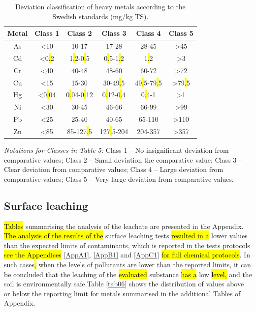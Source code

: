 \documentclass[algorithms,article,submit,pdftex,moreauthors]{Definitions/mdpi}
\begin{document}
\begin{table}[H] 
\begin{threeparttable}
\centering
\caption{Deviation classification of heavy metals according to the Swedish standards (mg/kg TS).\label{tab05}}
\begin{tabularx}{\textwidth}{CCCCCC}
\toprule
\textbf{Metal} & \textbf{Class 1} & \textbf{Class 2} & \textbf{Class 3} & \textbf{Class 4} & \textbf{Class 5}\\
\midrule
As & <10 & 10-17 & 17-28 & 28-45 & >45\\
Cd & <0\hl{.}2 & 1\hl{.}2-0\hl{.}5 & 0\hl{.}5-1\hl{.}2 & 1\hl{.}2 & >3\\
Cr & <40 & 40-48 & 48-60 & 60-72 & >72\\
Cu & <15 & 15-30 & 30-49\hl{.}5 & 49\hl{.}5-79\hl{.}5 & >79\hl{.}5\\
Hg & <0\hl{.}04 & 0\hl{.}04-0\hl{.}12 & 0\hl{.}12-0\hl{.}4 & 0\hl{.}4-1 & >1\\
Ni & <30 & 30-45 & 46-66 & 66-99 & >99\\
Pb & <25 & 25-40 & 40-65 & 65-110 & >110\\
Zn & <85 & 85-127\hl{.}5 & 127\hl{.}5-204 & 204-357 & >357\\
\bottomrule
\end{tabularx}
\begin{tablenotes}
      \small
      	\item \emph{Notations for Classes in Table 5:}  Class 1 -- No insignificant deviation from comparative values; Class 2 -- Small deviation the comparative value; Class 3 -- Clear deviation from comparative values; Class 4 -- Large deviation from comparative values; Class 5 -- Very large deviation from comparative values.
    \end{tablenotes}
  \end{threeparttable}
\end{table}

\subsection{Surface leaching}

\hl{Tables} summarising the analysis of the leachate are presented in the Appendix. \hl{The analysis of the results of the }surface leaching tests \hl{resulted in a} lower values than the expected limits of contaminants, which is reported in the tests protocols\hl{ see the Appendices} \ref{AppA1}, \ref{AppB1} and \ref{AppC1} \hl{for full chemical protocols}. In such cases\hl{, }when the levels of pollutants are lower than the reported limits, it can be concluded that the leaching of the \hl{evaluated }substance \hl{has a} low \hl{level, }and the soil is environmentally safe.Table \ref{tab06} shows the distribution of values above or below the reporting limit for metals summarised in the additional Tables of Appendix.
\end{document}
